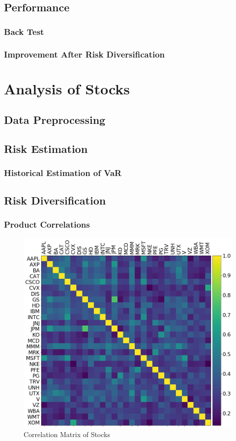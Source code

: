 \documentclass[11pt]{article} %
\theoremstyle{plain}
\theoremstyle{definition}
\begin{document}
\subsection{Performance}
\subsubsection{Back Test}
\subsubsection{Improvement After Risk Diversification}

\section{Analysis of Stocks}
\subsection{Data Preprocessing}
\subsection{Risk Estimation}
\subsubsection{Historical Estimation of VaR}
\subsection{Risk Diversification}
\subsubsection{Product Correlations}

\begin{figure}[ht]
    \includegraphics[width=1\linewidth, center]{resources/stock_corr.png}
    \caption{Correlation Matrix of Stocks}
    \label{fig:stockcorr}
\end{figure}
\end{document}
